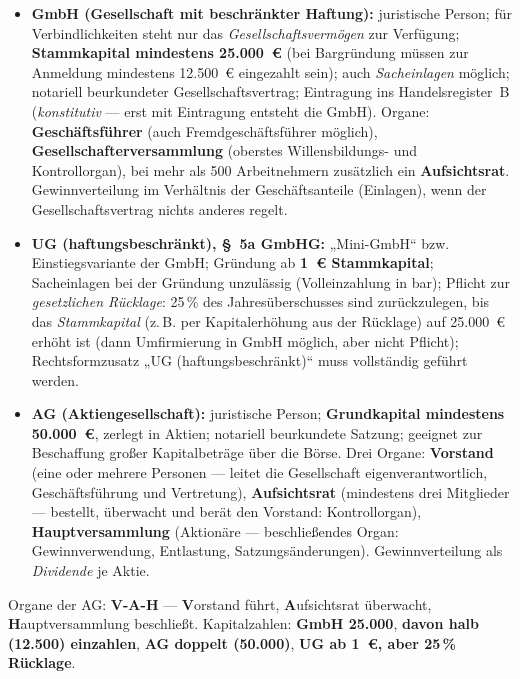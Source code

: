 \documentclass[11pt, a4paper]{article}
\begin{document}
\begin{itemize}
  \item \textbf{GmbH (Gesellschaft mit beschränkter Haftung):} juristische Person; für
    Verbindlichkeiten steht nur das \emph{Gesellschaftsvermögen} zur Verfügung;
    \textbf{Stammkapital mindestens 25.000~€} (bei Bargründung müssen zur Anmeldung
    mindestens 12.500~€ eingezahlt sein); auch \emph{Sacheinlagen} möglich; notariell
    beurkundeter Gesellschaftsvertrag; Eintragung ins Handelsregister~B
    (\emph{konstitutiv} --- erst mit Eintragung entsteht die GmbH). Organe:
    \textbf{Geschäftsführer} (auch Fremdgeschäftsführer möglich),
    \textbf{Gesellschafterversammlung} (oberstes Willensbildungs- und Kontrollorgan),
    bei mehr als 500 Arbeitnehmern zusätzlich ein \textbf{Aufsichtsrat}. Gewinnverteilung im
    Verhältnis der Geschäftsanteile (Einlagen), wenn der Gesellschaftsvertrag nichts
    anderes regelt.
  \item \textbf{UG (haftungsbeschränkt), §~5a GmbHG:} „Mini-GmbH`` bzw.
    Einstiegsvariante der GmbH; Gründung ab \textbf{1~€ Stammkapital}; Sacheinlagen bei
    der Gründung unzulässig (Volleinzahlung in bar); Pflicht zur \emph{gesetzlichen
    Rücklage}: 25\,\% des Jahresüberschusses sind zurückzulegen, bis das \emph{Stammkapital}
    (z.\,B. per Kapitalerhöhung aus der Rücklage) auf 25.000~€ erhöht ist (dann
    Umfirmierung in GmbH möglich, aber nicht Pflicht); Rechtsformzusatz „UG
    (haftungsbeschränkt)`` muss vollständig geführt werden.
  \item \textbf{AG (Aktiengesellschaft):} juristische Person; \textbf{Grundkapital
    mindestens 50.000~€}, zerlegt in Aktien; notariell beurkundete Satzung; geeignet zur
    Beschaffung großer Kapitalbeträge über die Börse. Drei Organe:
    \textbf{Vorstand} (eine oder mehrere Personen --- leitet die Gesellschaft
    eigenverantwortlich, Geschäftsführung und Vertretung), \textbf{Aufsichtsrat}
    (mindestens drei Mitglieder --- bestellt, überwacht und berät den Vorstand:
    Kontrollorgan), \textbf{Hauptversammlung} (Aktionäre --- beschließendes Organ:
    Gewinnverwendung, Entlastung, Satzungsänderungen). Gewinnverteilung als
    \emph{Dividende} je Aktie.
\end{itemize}

\begin{eselsbruecke}
Organe der AG: \textbf{V-A-H} --- \textbf{V}orstand führt, \textbf{A}ufsichtsrat
überwacht, \textbf{H}auptversammlung beschließt. Kapitalzahlen: \textbf{GmbH 25.000},
\textbf{davon halb (12.500) einzahlen}, \textbf{AG doppelt (50.000)}, \textbf{UG ab 1~€,
aber 25\,\% Rücklage}.
\end{eselsbruecke}
\end{document}
